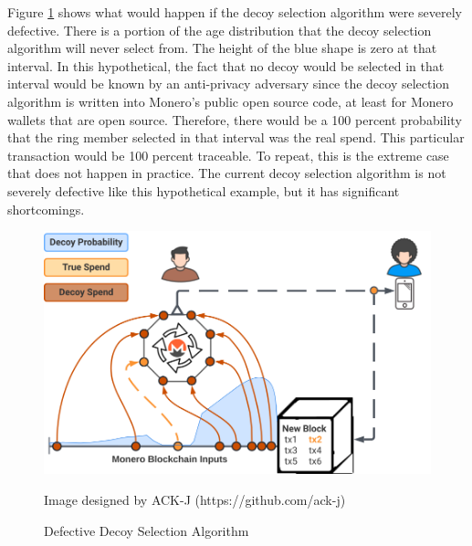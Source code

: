 \documentclass[english]{article}
\begin{document}
Figure \ref{figure-defective-dsa} shows what would happen if the
decoy selection algorithm were severely defective. There is a portion
of the age distribution that the decoy selection algorithm will never
select from. The height of the blue shape is zero at that interval.
In this hypothetical, the fact that no decoy would be selected in
that interval would be known by an anti-privacy adversary since the
decoy selection algorithm is written into Monero's public open source
code, at least for Monero wallets that are open source. Therefore,
there would be a 100 percent probability that the ring member selected
in that interval was the real spend. This particular transaction would
be 100 percent traceable. To repeat, this is the extreme case that
does not happen in practice. The current decoy selection algorithm
is not severely defective like this hypothetical example, but it has
significant shortcomings.

\begin{figure}[H]
\caption{Defective Decoy Selection Algorithm}

\begin{centering}
\includegraphics[scale=0.4]{images/decoy-selection-with-defective-DSA}
\par\end{centering}
\begin{centering}
{\footnotesize{}Image designed by ACK-J (https://github.com/ack-j)}{\footnotesize\par}
\par\end{centering}
\label{figure-defective-dsa}
\end{figure}
\end{document}
